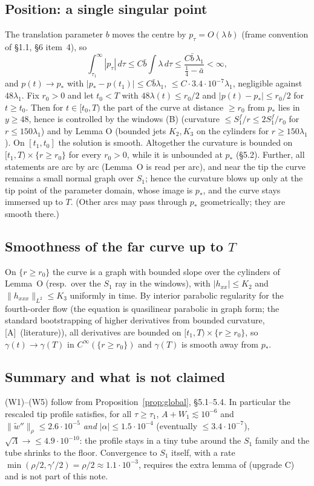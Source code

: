 \documentclass[11pt]{article}
\theoremstyle{definition}
\theoremstyle{remark}
\newcommand{\fn}[1]{\texttt{\detokenize{#1}}}
\newcommand{\tA}{\textsc{[A]}}
\newcommand{\norm}[1]{\lVert #1\rVert}
\begin{document}
\subsection{Position: a single singular point}
The translation parameter $b$ moves the centre by $p_\tau=O(\lambda\,b)$ (frame convention of \S1.1, \S6 item~4), so
\[
\int_{\tau_1}^\infty|p_\tau|\,d\tau\le C\bar b\int\lambda\,d\tau\le\frac{C\bar b\,\lambda_1}{\tfrac14-\bar a}<\infty ,
\]
and $p(t)\to p_*$ with $|p_*-p(t_1)|\le C\bar b\lambda_1$, $\le C\cdot3.4\cdot10^{-7}\lambda_1$, negligible against $48\lambda_1$. Fix $r_0>0$ and let $t_0<T$ with $48\lambda(t)\le r_0/2$ and $|p(t)-p_*|\le r_0/2$ for $t\ge t_0$. Then for $t\in[t_0,T)$ the part of the curve at distance $\ge r_0$ from $p_*$ lies in $y\ge48$, hence is controlled by the windows (B) (curvature $\le S_1^f/r\le2S_1^f/r_0$ for $r\le150\lambda_1$) and by Lemma O (bounded jets $K_2,K_3$ on the cylinders for $r\ge150\lambda_1$). On $[t_1,t_0]$ the solution is smooth. Altogether the curvature is bounded on $[t_1,T)\times\{r\ge r_0\}$ for every $r_0>0$, while it is unbounded at $p_*$ (\S5.2). Further, all statements are arc by arc (Lemma~O is read per arc), and near the tip the curve remains a small normal graph over $S_1$; hence the curvature blows up only at the tip point of the parameter domain, whose image is $p_*$, and the curve stays immersed up to $T$. (Other arcs may pass through $p_*$ geometrically; they are smooth there.)

\subsection{Smoothness of the far curve up to $T$}
On $\{r\ge r_0\}$ the curve is a graph with bounded slope over the cylinders of Lemma~O (resp.\ over the $S_1$ ray in the windows), with $|h_{xx}|\le K_2$ and $\norm{h_{xxx}}_{L^2}\le K_3$ uniformly in time. By interior parabolic regularity for the fourth-order flow (the equation is quasilinear parabolic in graph form; the standard bootstrapping of higher derivatives from bounded curvature, \tA\ (literature)), all derivatives are bounded on $[t_1,T)\times\{r\ge r_0\}$, so $\gamma(t)\to\gamma(T)$ in $C^\infty(\{r\ge r_0\})$ and $\gamma(T)$ is smooth away from $p_*$.

\subsection{Summary and what is not claimed}
(W1)--(W5) follow from Proposition~\ref{prop:global}, \S5.1--5.4. In particular the rescaled tip profile satisfies, for all $\tau\ge\tau_1$, $A+W_1\lesssim10^{-6}$ and $\norm{\tilde w''}_\rho\le2.6\cdot10^{-5}$ \emph{and} $|\alpha|\le1.5\cdot10^{-4}$ (eventually $\le3.4\cdot10^{-7}$), $\sqrt\Lambda\to\le4.9\cdot10^{-10}$: the profile stays in a tiny tube around the $S_1$ family and the tube shrinks to the floor. Convergence to $S_1$ itself, with a rate $\min(\rho/2,\gamma'/2)=\rho/2\approx1.1\cdot10^{-3}$, requires the extra lemma of \fn{STEP3_FIXPLAN.md} (upgrade C) and is not part of this note.
\end{document}
